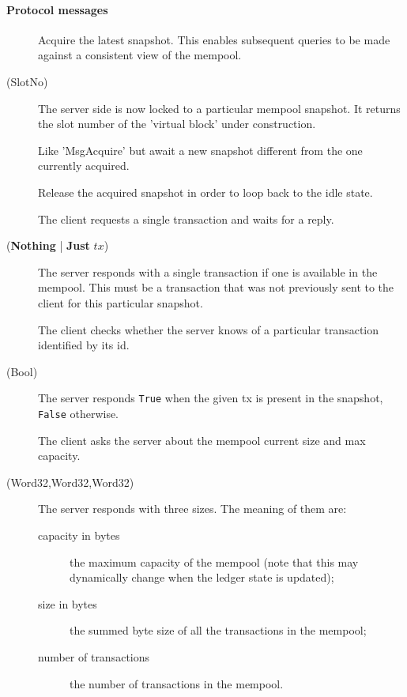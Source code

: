 \paragraph{Protocol messages}
\begin{description}
  \item[\MsgAcquire{}] Acquire the latest snapshot. This enables subsequent
    queries to be made against a consistent view of the mempool.
  \item[\MsgAcquired{} {\boldmath (SlotNo)}] The server side is now locked to
    a particular mempool snapshot. It returns the slot number of the 'virtual
    block' under construction.
  \item[\MsgAwaitAcquire{}] Like 'MsgAcquire' but await a new snapshot
    different from the one currently acquired.
  \item[\MsgRelease{}] Release the acquired snapshot in order to loop back to
    the idle state.
  \item[\MsgNextTx{}] The client requests a single transaction and waits for
    a reply.
  \item[\MsgReplyNextTx{} \boldmath(\textbf{Nothing} | \textbf{Just} $tx$)] The
    server responds with a single transaction if one is available in the
    mempool. This must be a transaction that was not previously sent to the
    client for this particular snapshot.
  \item[\MsgHasTx{}] The client checks whether the server knows of a particular
    transaction identified by its id.
  \item[\MsgReplyHasTx{} (Bool)] The server responds \texttt{True} when the given tx
    is present in the snapshot, \texttt{False} otherwise.
  \item[\MsgGetSizes{}] The client asks the server about the mempool current
    size and max capacity.
  \item[\MsgReplyGetSizes{} (Word32,Word32,Word32)] The server responds with
    three sizes.  The meaning of them are:
    \begin{description}
      \item[capacity in bytes] the maximum capacity of the mempool {\small (note that
        this may dynamically change when the ledger state is updated)};
      \item[size in bytes] the summed byte size of all the transactions in the
        mempool;
      \item[number of transactions] the number of transactions in the mempool.
    \end{description}

\end{description}
